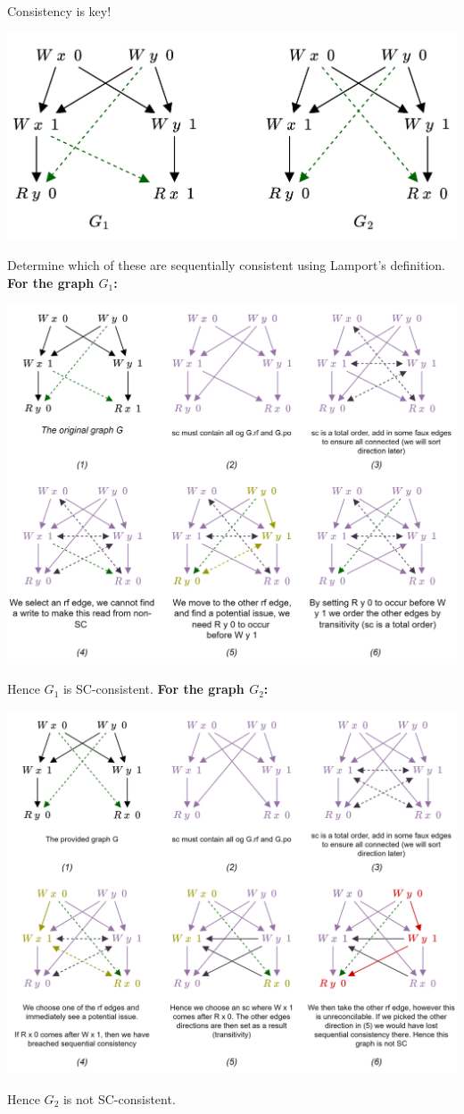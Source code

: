\begin{examplebox}{Consistency is key!}
	\begin{center}
		\includegraphics[width=.6\textwidth]{declarative_semantics/images/example_sequential_consistency.drawio.png}
	\end{center}
	Determine which of these are sequentially consistent using Lamport's definition.
	\tcblower
	\textbf{For the graph $G_1$:}
	\begin{center}
		\includegraphics[width=.9\textwidth]{declarative_semantics/images/example_sc_lamport_g1.drawio.png}
	\end{center}
	Hence $G_1$ is SC-consistent.
	\textbf{For the graph $G_2$:}
	\begin{center}
		\includegraphics[width=.9\textwidth]{declarative_semantics/images/example_sc_lamport_g2.drawio.png}
	\end{center}
	Hence $G_2$ is not SC-consistent.
\end{examplebox}

